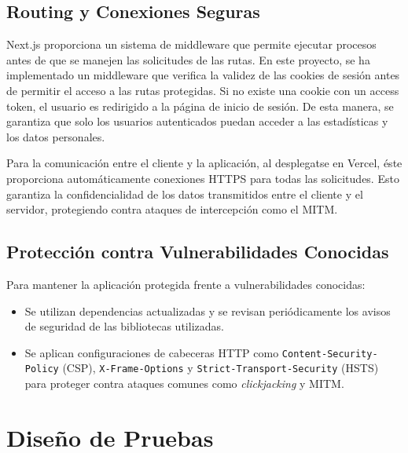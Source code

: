 \subsection{Routing y Conexiones Seguras}


Next.js proporciona un sistema de middleware que permite ejecutar procesos antes de que se manejen las solicitudes de las rutas. En este proyecto, se ha implementado un middleware que verifica la validez de las cookies de sesión antes de permitir el acceso a las rutas protegidas. Si no existe una cookie con un access token, el usuario es redirigido a la página de inicio de sesión. De esta manera, se garantiza que solo los usuarios autenticados puedan acceder a las estadísticas y los datos personales.

Para la comunicación entre el cliente y la aplicación, al desplegatse en Vercel, éste proporciona automáticamente conexiones HTTPS para todas las solicitudes. Esto garantiza la confidencialidad de los datos transmitidos entre el cliente y el servidor, protegiendo contra ataques de intercepción como el MITM.

\subsection{Protección contra Vulnerabilidades Conocidas}

Para mantener la aplicación protegida frente a vulnerabilidades conocidas:
\begin{itemize}
    \item Se utilizan dependencias actualizadas y se revisan periódicamente los avisos de seguridad de las bibliotecas utilizadas.
    \item Se aplican configuraciones de cabeceras HTTP como \texttt{Content-Security-Policy} (CSP), \texttt{X-Frame-Options} y \texttt{Strict-Transport-Security} (HSTS) para proteger contra ataques comunes como \textit{clickjacking} y MITM.
\end{itemize}



\section{Diseño de Pruebas}